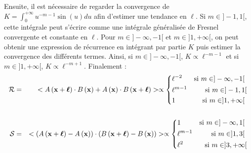  Ensuite, il est nécessaire de regarder la convergence de $K = \int_0^{+\infty} u^{-m-1} \sin\left(u\right) du$ afin d'estimer une tendance en $\ell$. Si $m \in ]-1,1[$, cette intégrale peut s'écrire comme une intégrale généralisée de Fresnel convergente et constante en $\ell$. Pour $m \in ]-\infty,-1[$ et $m \in ]1,+\infty[$, on peut obtenir une expression de récurrence en intégrant par partie $K$ puis estimer la convergence des différents termes. Ainsi, si $m \in ]-\infty,-1[$, $K\propto \ell^{-m-1}$ et si $m \in ]1,+\infty[$, $K\propto \ell^{-m+1}$. Finalement :
 \begin{eqnarray}
     \mathcal{R} &=& <A\left({\bf x} + \boldsymbol{\ell}\right)  \cdot B\left({\bf x}\right) + A\left({\bf x}\right)  \cdot B\left({\bf x} + \boldsymbol{\ell}\right)> 
 \propto \left\{
     \begin{aligned}
     &\ell^{-2}& \textrm{si $m \in ]-\infty,-1[$ } \\
  &\ell^{m-1}&  \textrm{si $m \in ]-1,1[$}  \\
  &1& \textrm{si $m \in ]1,+\infty[$ } 
 \end{aligned}
 \right.\nonumber  \\
 &&\\
    \mathcal{S} &=& <\left(A\left({\bf x} + \boldsymbol{\ell}\right) - A\left({\bf x}\right)\right)\cdot\left(B\left({\bf x} + \boldsymbol{\ell}\right) - B\left({\bf x}\right)\right) > 
 \propto \left\{
     \begin{aligned}
     & 1 & \textrm{si $m \in ]-\infty,1[$ } \\
 & \ell^{m-1}&  \textrm{si $m \in ]1,3[$ }  \\
 & \ell^2 & \textrm{si $m \in ]3,+\infty[$}
 \end{aligned}
 \right. \nonumber\\
 \end{eqnarray}

